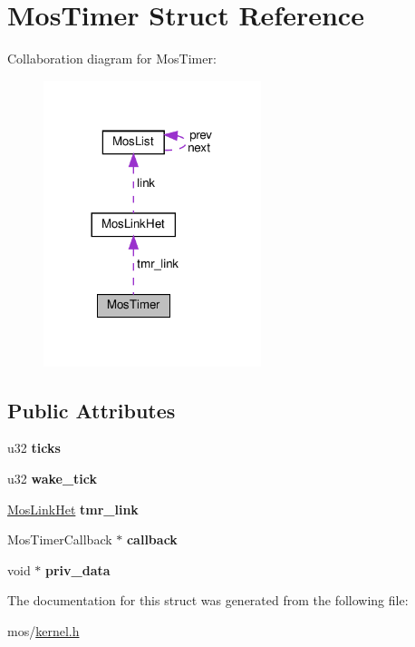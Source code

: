 \hypertarget{structMosTimer}{}\section{Mos\+Timer Struct Reference}
\label{structMosTimer}


Collaboration diagram for Mos\+Timer\+:\nopagebreak
\begin{figure}[H]
\begin{center}
\leavevmode
\includegraphics[width=180pt]{structMosTimer__coll__graph}
\end{center}
\end{figure}
\subsection*{Public Attributes}
\begin{DoxyCompactItemize}
\item 
\mbox{\label{structMosTimer_aef14c6b3f240508770bf0fa2f5b34632}} 
u32 {\bfseries ticks}
\item 
\mbox{\label{structMosTimer_aecf6b6fc65c6799e07098d340e5d1708}} 
u32 {\bfseries wake\+\_\+tick}
\item 
\mbox{\label{structMosTimer_a877e79e2e2b0a641ff6cefdee403f4ab}} 
\hyperlink{structMosLinkHet}{Mos\+Link\+Het} {\bfseries tmr\+\_\+link}
\item 
\mbox{\label{structMosTimer_a60ff56f2039fda6e9695e74ed0224fcc}} 
Mos\+Timer\+Callback $\ast$ {\bfseries callback}
\item 
\mbox{\label{structMosTimer_a50c5249cc6bb9d9270071646cbde1c5c}} 
void $\ast$ {\bfseries priv\+\_\+data}
\end{DoxyCompactItemize}


The documentation for this struct was generated from the following file\+:\begin{DoxyCompactItemize}
\item 
mos/\hyperlink{kernel_8h}{kernel.\+h}\end{DoxyCompactItemize}
